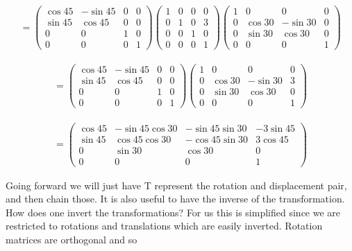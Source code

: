 \[\begin{aligned}
= \begin{pmatrix}\cos 45 & -\sin 45 & 0 & 0 \\
         \sin 45 & \cos 45 & 0 & 0\\ 0 &0 & 1 & 0 \\
         0& 0& 0& 1 \end{pmatrix}
         \begin{pmatrix}1 & 0 & 0 & 0 \\
         0 & 1 & 0 & 3\\ 0 &0 & 1 & 0 \\
         0& 0& 0& 1 \end{pmatrix}
         \begin{pmatrix}1 & 0 & 0 & 0 \\ 0 & \cos 30 & -\sin 30 & 0  \\
         0& \sin 30 & \cos 30 & 0 \\
         0& 0& 0& 1 \end{pmatrix}
\end{aligned}\]

\[\begin{aligned}
=
\begin{pmatrix}\cos 45 & -\sin 45 & 0 & 0 \\
         \sin 45 & \cos 45 & 0 & 0\\ 0 &0 & 1 & 0 \\
         0& 0& 0& 1 \end{pmatrix}
\begin{pmatrix}1 & 0 & 0 & 0 \\
         0 & \cos 30 & -\sin 30 & 3\\ 0 &\sin 30 & \cos 30 & 0 \\
         0& 0& 0& 1 \end{pmatrix}
\end{aligned}\]

\[\begin{aligned}
=
\begin{pmatrix}
         \cos 45 & -\sin 45 \cos 30 & -\sin 45 \sin 30 & -3\sin 45 \\
         \sin 45 & \cos 45 \cos 30 & -\cos 45 \sin 30 & 3\cos 45\\
         0       & \sin 30 & \cos 30 & 0 \\
         0       & 0& 0& 1 \end{pmatrix}
\end{aligned}\]

Going forward we will just have T represent the rotation and
displacement pair, and then chain those. It is also useful to have the
inverse of the transformation. How does one invert the transformations?
For us this is simplified since we are restricted to rotations and
translations which are easily inverted. Rotation matrices are orthogonal
and so

